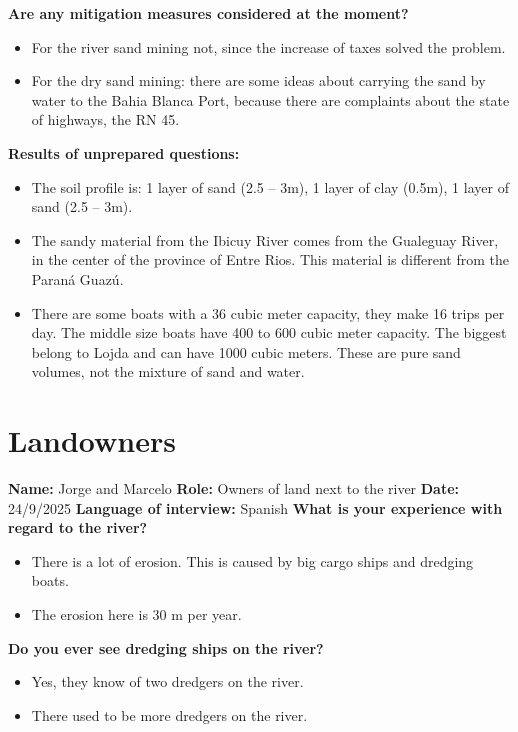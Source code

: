 \textbf{Are any mitigation measures considered at the moment?}
\begin{itemize}
    \item For the river sand mining not, since the increase of taxes solved the problem.
    \item For the dry sand mining: there are some ideas about carrying the sand by water to the Bahia Blanca Port, because there are complaints about the state of highways, the RN 45.
\end{itemize}

\textbf{Results of unprepared questions:}
\begin{itemize}
    \item The soil profile is: 1 layer of sand (2.5 – 3m), 1 layer of clay (0.5m), 1 layer of sand (2.5 – 3m).
    \item The sandy material from the Ibicuy River comes from the Gualeguay River, in the center of the province of Entre Rios. This material is different from the Paraná Guazú.
    \item There are some boats with a 36 cubic meter capacity, they make 16 trips per day. The middle size boats have 400 to 600 cubic meter capacity. The biggest belong to Lojda and can have 1000 cubic meters. These are pure sand volumes, not the mixture of sand and water.
\end{itemize}

\section{Landowners}
\textbf{Name:} Jorge and Marcelo \newline
\textbf{Role:} Owners of land next to the river \newline
\textbf{Date:} 24/9/2025 \newline
\textbf{Language of interview:} Spanish \newline \newline
\textbf{What is your experience with regard to the river?}
\begin{itemize}
    \item There is a lot of erosion. This is caused by big cargo ships and dredging boats.
    \item The erosion here is 30 m per year.
\end{itemize}

\textbf{Do you ever see dredging ships on the river?}
\begin{itemize}
    \item Yes, they know of two dredgers on the river.
    \item There used to be more dredgers on the river.
\end{itemize}

